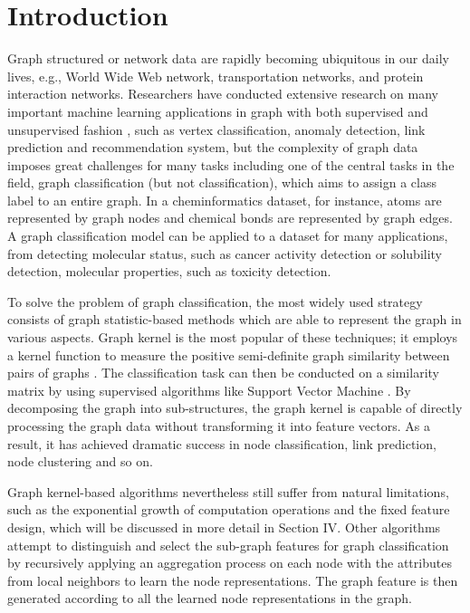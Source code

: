\documentclass[conference]{IEEEtran}
\begin{document}
	
	\section{Introduction}

	     \par Graph structured or network data are rapidly becoming ubiquitous in our daily lives, e.g., World Wide Web network, transportation networks, and protein interaction networks. Researchers have conducted extensive research on many important machine learning applications in graph with both supervised and unsupervised fashion \cite{bacciu2018contextual}, such as vertex classification\cite{chuang1990three}, anomaly detection\cite{noble2003graph}, link prediction\cite{li2018diffusion} and recommendation system\cite{fouss2007random}, but the complexity of graph data imposes great challenges for many tasks including one of the central tasks in the field, graph classification (but not  classification), which aims to assign a class label to an entire graph. In a cheminformatics dataset, for instance, atoms are represented by graph nodes and chemical bonds are represented by graph edges. A graph classification model can be applied to a dataset for many applications, from detecting molecular status, such as cancer activity detection or solubility detection, molecular properties, such as toxicity detection.
	   
	     To solve the problem of graph classification, the most widely used strategy consists of graph statistic-based methods which are able to represent the graph in various aspects. Graph kernel\cite{vishwanathan2010graph,shervashidze2011weisfeiler} is the most popular of these techniques; it employs a kernel function to measure the positive semi-definite graph similarity between pairs of graphs \cite{shervashidze2009efficient}. The classification task can then be conducted on a similarity matrix by using supervised algorithms like Support Vector Machine \cite{cortes1995support}. By decomposing the graph into sub-structures, the graph kernel is capable of directly processing the graph data without transforming it into feature vectors. As a result, it has achieved dramatic success in node classification, link prediction, node clustering and so on.
	   
	     Graph kernel-based algorithms nevertheless still suffer from natural limitations, such as the exponential growth of computation operations and the fixed feature design, which will be discussed in more detail in Section IV. 
	     Other algorithms \cite{pan2016joint} attempt to distinguish and select the sub-graph features for graph classification by recursively applying an aggregation process on each node with the attributes from local neighbors to learn the node representations. The graph feature is then generated according to all the learned node representations in the graph.
\end{document}
